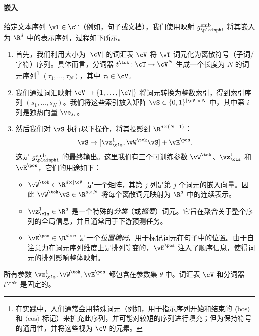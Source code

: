 \documentclass[../../book-main_zh.tex]{subfiles}
\begin{document}
\paragraph{嵌入} 给定文本序列 \(\vT \in \cT\)（例如，句子或文档），我们使用映射 \(g_{\plainphi}^{\text{emb}}\) 将其嵌入为 \(\R^d\) 中的表示序列，过程如下所示。
\begin{enumerate}
    \item 首先，我们利用大小为 \(|\cV|\) 的词汇表 \(\cV\) 将 \(\vT\) 词元化为离散符号（子词/字符）序列。具体而言，分词器 \(t^{\tok} : \cT \to \cV^{N}\) 生成一个长度为 \(N\) 的词元序列\footnote{在实践中，人们通常会用特殊词元（例如，用于指示序列开始和结束的 \(\langle \text{bos}\rangle\) 和 \(\langle \text{eos}\rangle\) 标记）来扩充此序列，并可能对较短的序列进行填充；但为保持符号的通用性，并将这些视为 \(\cV\) 的元素。} \((\tau_{1},\dots,\tau_{N})\)，其中 \(\tau_i \in \cV\)。
    \item 我们通过词汇映射 \(\cV\to\{1,\dots,|\cV|\}\) 将词元转换为整数索引，得到索引序列 \((s_{1},\dots,s_{N})\)。我们将这些索引放入矩阵 \(\vS \in \{0,1\}^{|\cV|\times N}\) 中，其中第 \(i\) 列是独热向量 \(\ve_{s_i}\)。
    \item 然后我们对 \(\vS\) 执行以下操作，将其投影到 \(\R^{d \times (N+1)}\)：
        \begin{equation}
            \vS \mapsto [\vz_{\cls}^{1}, \vW^{\tok}\vS] + \vE^{\pos}.
        \end{equation}
        这是 \(g_{\plainphi}^{\text{emb}}\) 的最终输出。这里我们有三个可训练参数 \(\vW^{\tok}\)、\(\vz_{\cls}^{1}\) 和 \(\vE^{\pos}\)，它们的用途如下：
        \begin{itemize}
            \item \(\vW^{\tok} \in \R^{d \times |\cV|}\) 是一个矩阵，其第 \(j\) 列是第 \(j\) 个词元的嵌入向量。因此 \(\vW^{\tok}\vS
                \in \R^{d\times N}\) 将每个离散词元映射为 \(\R^{d}\) 中的连续表示。
            \item \(\vz_{\cls}^{1} \in \R^{d}\) 是一个特殊的\textit{分类}（或\textit{摘要}）词元。它旨在聚合关于整个序列的全局信息，并且通常用于下游预测任务。
            \item \(\vE^{\pos} \in \R^{d \times n}\) 是一个\textit{位置编码}，用于标记词元在句子中的位置。由于自注意力在词元序列维度上是排列等变的，\(\vE^{\pos}\) 注入了顺序信息，使得词元的排列影响整体映射。
        \end{itemize}
\end{enumerate}
所有参数 \(\vz_{\cls}^{1}, \vW^{\tok}, \vE^{\pos}\) 都包含在参数集 \(\theta\) 中。词汇表 \(\cV\) 和分词器 \(t^{\tok}\) 是固定的。
\end{document}
